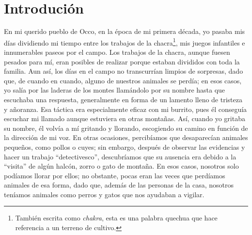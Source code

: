 \cleardoublepage
\newpage
\ifdefined\EnableIncludeImages
\fi
\chapter*{Introdución} %

En mi querido pueblo de Occo, en la época de mi primera década, yo pasaba mis días dividiendo mi tiempo entre los trabajos de la chacra\footnote{También escrita como \textit{chakra}, esta es una palabra quechua que hace referencia a un terreno de cultivo.}, mis juegos infantiles e innumerables paseos por el campo.
Los trabajos de la chacra, aunque fuesen pesados para mí, eran posibles de realizar porque estaban divididos con toda la familia. 
Aun así, los días en el campo no transcurrían limpios de sorpresas, dado que, de cuando en cuando, alguno de nuestros animales se perdía; en esos casos, yo salía por las laderas de los montes llamándolo por su nombre hasta que escuchaba una respuesta, generalmente en forma de un lamento lleno de tristeza y añoranza.
Esa táctica era especialmente eficaz con mi burrito, pues él conseguía escuchar mi llamado aunque estuviera en otras montañas. Así, cuando yo gritaba su nombre, él volvía a mí gritando y llorando, escogiendo su camino en función de la dirección de mi voz.  
En otras ocasiones, percibíamos que desaparecían animales pequeños, como pollos o cuyes; sin embargo, después de observar las evidencias y hacer un trabajo ``detectivesco'', descubríamos que su ausencia era debido a la ``visita'' de algún halcón, zorro o gato de montaña.
En esos casos, nosotros solo podíamos llorar por ellos; no obstante, pocas eran las veces que perdíamos animales de esa forma, dado que, además de las personas de la casa, nosotros teníamos animales como perros y gatos que nos ayudaban a vigilar.

